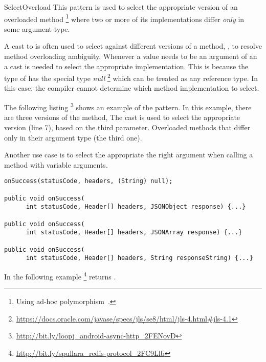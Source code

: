 \begin{pattern}{SelectOverload}
This pattern is used to select the appropriate version of an overloaded method%
\footnote{Using ad-hoc polymorphism~\citep{stracheyFundamentalConceptsProgramming2000}.}
where two or more of its implementations differ \emph{only} in some argument type.

A cast to  is often used to select against different versions
of a method, \ie{}, to resolve method overloading ambiguity.
Whenever a  value needs to be an argument of an a cast is
needed to select the appropriate implementation.
This is because the type of  has the special type \emph{null}%
\footnote{\url{https://docs.oracle.com/javase/specs/jls/se8/html/jls-4.html\#jls-4.1}}
which can be treated as any reference type.
In this case,
the compiler cannot determine which method implementation to select.

\instances{}
The following listing%
\footnote{\url{http://bit.ly/loopj_android-async-http_2FENovD}}
shows an example of the \thisp{} pattern.
In this example, there are three versions of the  method,
The cast  is used to select the appropriate version
(line 7), based on the third parameter.
Overloaded methods that differ only in their argument type (the third one).

Another use case is to select the appropriate the right argument when
calling a method with variable arguments.

\begin{verbatim}
onSuccess(statusCode, headers, (String) null);

public void onSuccess(
      int statusCode, Header[] headers, JSONObject response) {...}

public void onSuccess(
      int statusCode, Header[] headers, JSONArray response) {...}

public void onSuccess(
      int statusCode, Header[] headers, String responseString) {...}
\end{verbatim}

In the following example%
\footnote{\url{http://bit.ly/spullara_redis-protocol_2FC9Llb}}
 returns .
%


\end{pattern}

